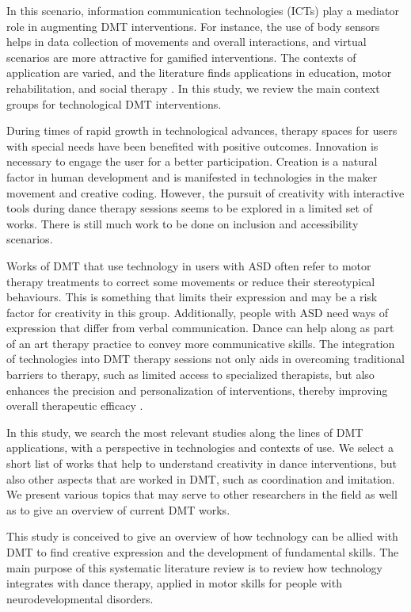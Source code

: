 \documentclass[a4paper,fleqn]{cas-sc}
\begin{document}
In this scenario, information communication technologies (ICTs) play a mediator role in augmenting DMT interventions. For instance, the use of body sensors helps in data collection of movements and overall interactions, and virtual scenarios are more attractive for gamified interventions. The contexts of application are varied, and the literature finds applications in education, motor rehabilitation, and social therapy \cite{Srinivasan2013}.  In this study, we review the main context groups for technological DMT interventions.

During times of rapid growth in technological advances, therapy spaces for users with special needs have been benefited with positive outcomes. Innovation is necessary to engage the user for a better participation. Creation is a natural factor in human development and is manifested in technologies in the maker movement and creative coding. However, the pursuit of creativity with interactive tools during dance therapy sessions seems to be explored in a limited set of works. There is still much work to be done on inclusion and accessibility scenarios.

Works of DMT that use technology in users with ASD often refer to motor therapy treatments to correct some movements or reduce their stereotypical behaviours. This is something that limits their expression and may be a risk factor for creativity in this group. Additionally, people with ASD need ways of expression that differ from verbal communication. Dance can help along as part of an art therapy practice to convey more communicative skills. The integration of technologies into DMT therapy sessions not only aids in overcoming traditional barriers to therapy, such as limited access to specialized therapists, but also enhances the precision and personalization of interventions, thereby improving overall therapeutic efficacy \cite{Kientz2013}.


In  this study, we search the most relevant studies along the lines of DMT applications, with a perspective in technologies and contexts of use. We select a short list of works that help to understand creativity in dance interventions, but also other aspects that are worked in DMT, such as coordination and imitation. We present various topics that may serve to other researchers in the field as well as to give an overview of current DMT works.

This study is conceived to give an overview of how technology can be allied with DMT to find creative expression and the development of fundamental skills. The main purpose of this systematic literature review is to review how technology integrates with dance therapy, applied in motor skills for people with neurodevelopmental disorders.
\end{document}
